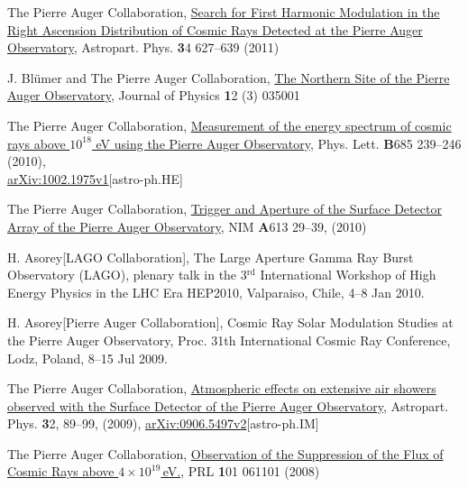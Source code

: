 \begin{etaremune}
\item {}The Pierre Auger Collaboration,
\href{http://dx.doi.org/10.1016/j.astropartphys.2010.12.007}{{Search for
First Harmonic Modulation in the Right Ascension Distribution of Cosmic Rays
Detected at the Pierre Auger Observatory}}, Astropart.
Phys. {\textbf 34} 627--639
(2011)

\item {}J. Blümer and The Pierre Auger Collaboration,
\href{http://dx.doi.org/10.1088/1367-2630/12/3/035001}{{The Northern Site
of the Pierre Auger Observatory}}, Journal of Physics {\textbf 12} (3) 035001

\item {}The Pierre Auger Collaboration,
\href{http://dx.doi.org/10.1016/j.physletb.2010.02.013}{{Measurement of
the energy spectrum of cosmic rays above $10^{18}$ eV using the Pierre Auger
Observatory}}, Phys.
Lett. {\textbf B685} 239--246 (2010),\\
\href{http://arxiv.org/abs/1002.1975}{arXiv:1002.1975v1}[astro-ph.HE]

\item {}The Pierre Auger Collaboration,
\href{http://dx.doi.org/10.1016/j.nima.2009.11.018}{{Trigger and Aperture
of the Surface Detector Array of the Pierre Auger Observatory}}, NIM {\textbf A613}
29--39, (2010)

\item {}H. Asorey[LAGO Collaboration], {{The Large Aperture Gamma Ray
Burst Observatory (LAGO)}}, plenary talk in the 3$^{\mathrm{rd}}$ International Workshop of
High Energy Physics in the LHC Era HEP2010, Valparaiso, Chile, 4--8 Jan 2010.

\item {}H. Asorey[Pierre Auger Collaboration], {{Cosmic Ray Solar
Modulation Studies at the Pierre Auger Observatory}}, \en Proc.
31th
International Cosmic Ray Conference, Lodz, Poland, 8--15 Jul 2009.

\item {} The Pierre Auger Collaboration,
\href{http://dx.doi.org/10.1016/j.astropartphys.2009.06.004}{{Atmospheric
effects on extensive air showers observed with the Surface Detector of the
Pierre Auger Observatory}}, Astropart.
Phys. {\textbf 32}, 89--99, (2009),
\href{http://arxiv.org/abs/0906.5497/}{arXiv:0906.5497v2}[astro-ph.IM]

\item {}The Pierre Auger Collaboration,
\href{http://dx.doi.org/10.1103/PhysRevLett.101.061101}{{Observation of
the Suppression of the Flux of Cosmic Rays above $4\times10^{19}$\,eV.}}, PRL
{\textbf 101} 061101 (2008)


\end{etaremune}
